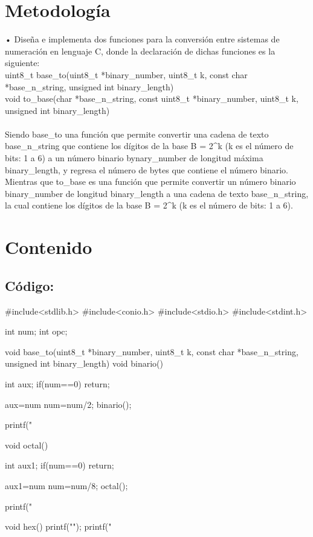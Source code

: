 \documentclass[conference]{IEEEtran}
\begin{document}
\section{Metodología}
• Diseña e implementa dos funciones para la conversión entre sistemas de numeración en lenguaje C, donde la declaración de dichas funciones es la siguiente: \\

uint8_t base_to(uint8_t *binary_number, uint8_t k, const char *base_n_string, unsigned int binary_length) \\
void to_base(char *base_n_string, const uint8_t *binary_number, uint8_t k, unsigned int binary_length)\\

\\ Siendo base_to una función que permite convertir una cadena de texto base_n_string que contiene los dígitos de la base B = 2^k (k es el número de bits: 1 a 6) a un número binario bynary_number de longitud máxima binary_length, y regresa el número de bytes que contiene el número binario. Mientras que to_base es una función que permite convertir un número binario binary_number de longitud binary_length a una cadena de texto base_n_string, la cual contiene los dígitos de la base B = 2^k (k es el número de bits: 1 a 6).

\section{Contenido}
\subsection{Código:}
#include<stdlib.h>
#include<conio.h>
#include<stdio.h>
#include<stdint.h>

int num;
int opc;

void base_to(uint8_t *binary_number, uint8_t k, const char *base_n_string, unsigned int binary_length){
	}void binario() 
	{ 
	   int aux; 
	   if(num==0) 
	      return; 
	
	   aux=num%
	   num=num/2; 
	   binario(); 

	   printf(" %
	}
	void octal(){
	    int aux1; 
	   if(num==0) 
	      return; 
	
	   aux1=num%
	   num=num/8; 
	   octal(); 
	
	   printf(" %
	}
	
	void hex(){
	 printf("\n");
	 printf(" %
	}
\end{document}
